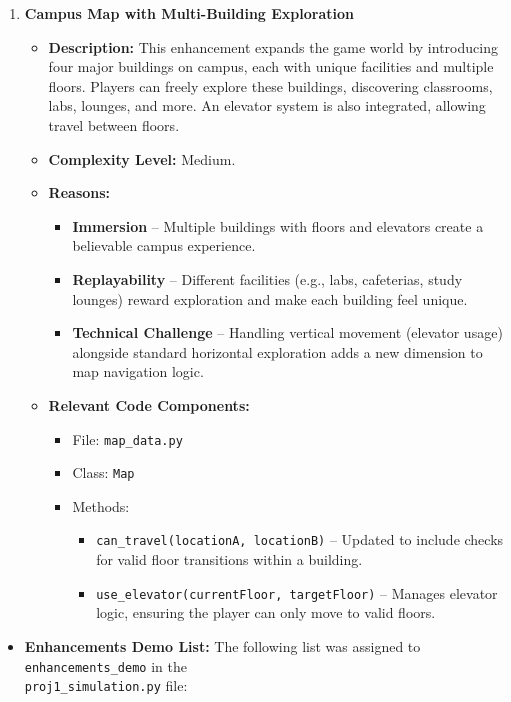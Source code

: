 \documentclass[11pt]{article}
\begin{document}
\begin{enumerate}
    \item \textbf{Campus Map with Multi-Building Exploration}
    \begin{itemize}
        \item \textbf{Description:}  
        This enhancement expands the game world by introducing four major buildings on campus, each with unique facilities and multiple floors. Players can freely explore these buildings, discovering classrooms, labs, lounges, and more. An elevator system is also integrated, allowing travel between floors.
        \item \textbf{Complexity Level:} Medium.
        \item \textbf{Reasons:}  
        \begin{itemize}
            \item \textbf{Immersion} – Multiple buildings with floors and elevators create a believable campus experience.
            \item \textbf{Replayability} – Different facilities (e.g., labs, cafeterias, study lounges) reward exploration and make each building feel unique.
            \item \textbf{Technical Challenge} – Handling vertical movement (elevator usage) alongside standard horizontal exploration adds a new dimension to map navigation logic.
        \end{itemize}
        \item \textbf{Relevant Code Components:}  
        \begin{itemize}
            \item File: \texttt{map\_data.py}
            \item Class: \texttt{Map}
            \item Methods:
            \begin{itemize}
                \item \texttt{can\_travel(locationA, locationB)} – Updated to include checks for valid floor transitions within a building.
                \item \texttt{use\_elevator(currentFloor, targetFloor)} – Manages elevator logic, ensuring the player can only move to valid floors.
            \end{itemize}
        \end{itemize}
    \end{itemize}
    
\end{enumerate}

\begin{itemize}
    \item \textbf{Enhancements Demo List:}  
    The following list was assigned to 
    \texttt{enhancements\_demo} in the\\ 
    \texttt{proj1\_simulation.py} file:
\end{itemize}
\end{document}
